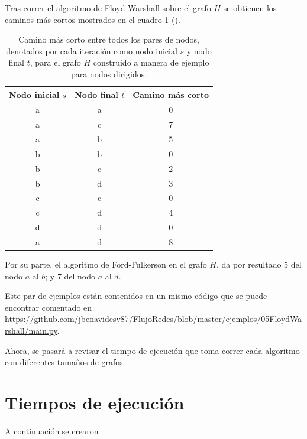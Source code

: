 \documentclass{article}
\begin{document}
  Tras correr el algoritmo de Floyd-Warshall sobre el grafo $H$ se obtienen los caminos más cortos mostrados en el cuadro \ref{cuadro:floyd-ejemploDirigido} (\pageref{cuadro:floyd-ejemploDirigido}).

  \begin{table}[]
  \centering
  \caption{Camino más corto entre todos los pares de nodos, denotados por cada iteración como nodo inicial $s$ y nodo final $t$, para el grafo $H$ construido a manera de ejemplo para nodos dirigidos.}
  \label{cuadro:floyd-ejemploDirigido}
  \begin{tabular}{@{}ccc@{}}
  \toprule
  \textbf{Nodo inicial $s$} & \textbf{Nodo final $t$} & \textbf{Camino más corto} \\ \midrule
  a & a & 0 \\ \midrule
  a & c & 7 \\ \midrule
  a & b & 5 \\ \midrule
  b & b & 0 \\ \midrule
  b & c & 2 \\ \midrule
  b & d & 3 \\ \midrule
  c & c & 0 \\ \midrule
  c & d & 4 \\ \midrule
  d & d & 0 \\ \midrule
  a & d & 8 \\ \bottomrule
  \end{tabular}
  \end{table}

  Por su parte, el algoritmo de Ford-Fulkerson en el grafo $H$, da por resultado $5$ del nodo $a$ al $b$; y $7$ del nodo $a$ al $d$.

  Este par de ejemplos están contenidos en un mismo código que se puede encontrar comentado en \url{https://github.com/jbenavidesv87/FlujoRedes/blob/master/ejemplos/05FloydWarshall/main.py}.

  Ahora, se pasará a revisar el tiempo de ejecución que toma correr cada algoritmo con diferentes tamaños de grafos.

  \section{Tiempos de ejecución}

  A continuación se crearon 

\end{document}
